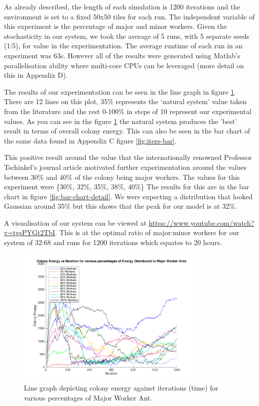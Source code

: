 As already described, the length of each simulation is 1200 iterations and the environment is set to a fixed 50x50 tiles for each run. The independent variable of this experiment is the percentage of major and minor workers. Given the stochasticity in our system, we took the average of 5 runs, with 5 separate seeds (1:5), for value in the experimentation. The average runtime of each run in an experiment was 63\si{s}. However all of the results were generated using Matlab's parallelisation ability where multi-core CPUs can be leveraged (more detail on this in Appendix D).\par
The results of our experimentation can be seen in the line graph in figure \ref{fig:iters-line}. There are 12 lines on this plot, 35\% represents the `natural system' value taken from the literature \cite{Tschinkel1988} and the rest 0-100\% in steps of 10 represent our experimental values. As you can see in the figure \ref{fig:iters-line} the natural system produces the 'best' result in terms of overall colony energy. This can also be seen in the bar chart of the same data found in Appendix C figure \ref{fig:iters-bar}.\par
This positive result around the value that the internationally renowned Professor Tschinkel's journal article \cite{Tschinkel1988} motivated further experimentation around the values between 30\% and 40\% of the colony being major workers. The values for this experiment were \{30\%, 32\%, 35\%, 38\%, 40\%\} The results for this are in the bar chart in figure \ref{fig:bar-chart-detail}. We were expecting a distribution that looked Gaussian around 35\% but this shows that the peak for our model is at 32\%.\par
A visualisation of our system can be viewed at \url{https://www.youtube.com/watch?v=tgsPYGt2TbI}. This is at the optimal ratio of major:minor workers for our system of 32:68 and runs for 1200 iterations which equates to 20 hours.\par

\begin{figure}[H]
  \centering
  \includegraphics[width=0.8\textwidth]{images/line-graph-results.png}
  \caption{Line graph depicting colony energy against iterations (time) for various percentages of Major Worker Ant.}
  \label{fig:iters-line}
\end{figure}

